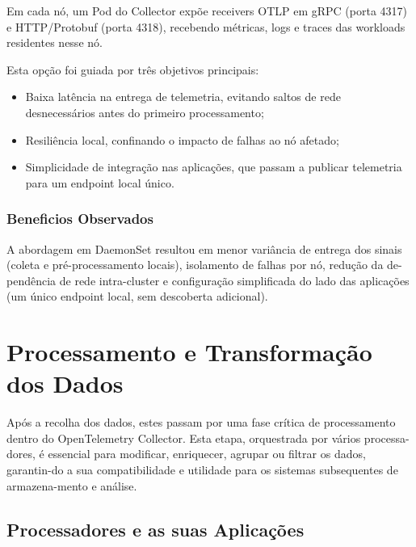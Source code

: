 Em cada nó, um Pod do Collector expõe receivers OTLP em gRPC (porta 4317) e HTTP/Protobuf (porta 4318), recebendo métricas, logs e traces das workloads residentes nesse nó. 

Esta opção foi guiada por três objetivos principais:  

\begin{itemize}
    \item Baixa latência na entrega de telemetria, evitando saltos de rede desnecessários antes do primeiro processamento;
    \item Resiliência local, confinando o impacto de falhas ao nó afetado; 
    \item Simplicidade de integração nas aplicações, que passam a publicar telemetria para um endpoint local único.
\end{itemize}

\subsubsection{Beneficios Observados}


A abordagem em DaemonSet resultou em menor variância de entrega dos sinais (coleta e pré-processamento locais), isolamento de falhas por nó, redução da de-pendência de rede intra-cluster e configuração simplificada do lado das aplicações (um único endpoint local, sem descoberta adicional).

\section{Processamento e Transformação dos Dados}

Após a recolha dos dados, estes passam por uma fase crítica de processamento dentro do OpenTelemetry Collector. Esta etapa, orquestrada por vários processa-dores, é essencial para modificar, enriquecer, agrupar ou filtrar os dados, garantin-do a sua compatibilidade e utilidade para os sistemas subsequentes de armazena-mento e análise.

\subsection{Processadores e as suas Aplicações}



